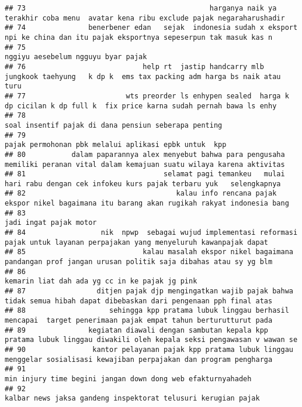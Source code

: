 \documentclass[
]{article}
\begin{document}
\begin{verbatim}
## 73                                            harganya naik ya terakhir coba menu  avatar kena ribu exclude pajak negaraharushadir  
## 74               benerbener edan   sejak  indonesia sudah x eksport npi ke china dan itu pajak eksportnya sepeserpun tak masuk kas n
## 75                                                                                                nggiyu aesebelum ngguyu byar pajak
## 76                            help rt  jastip handcarry mlb jungkook taehyung   k dp k  ems tax packing adm harga bs naik atau turu 
## 77                        wts preorder ls enhypen sealed  harga k dp cicilan k dp full k  fix price karna sudah pernah bawa ls enhy 
## 78                                                                            soal insentif pajak di dana pensiun seberapa penting  
## 79                                                                            pajak permohonan pbk melalui aplikasi epbk untuk  kpp 
## 80           dalam paparannya alex menyebut bahwa para pengusaha memiliki peranan vital dalam kemajuan suatu wilaya karena aktivitas
## 81                                 selamat pagi temankeu   mulai hari rabu dengan cek infokeu kurs pajak terbaru yuk   selengkapnya 
## 82                                    kalau info rencana pajak  ekspor nikel bagaimana itu barang akan rugikah rakyat indonesia bang
## 83                                                                                                           jadi ingat pajak motor 
## 84                  nik  npwp  sebagai wujud implementasi reformasi pajak untuk layanan perpajakan yang menyeluruh kawanpajak dapat 
## 85                            kalau masalah ekspor nikel bagaimana pandangan prof jangan urusan politik saja dibahas atau sy yg blm 
## 86                                                                                   kemarin liat dah ada yg cc in ke pajak jg pink 
## 87                 ditjen pajak djp mengingatkan wajib pajak bahwa tidak semua hibah dapat dibebaskan dari pengenaan pph final atas 
## 88                    sehingga kpp pratama lubuk linggau berhasil mencapai  target penerimaan pajak empat tahun berturutturut pada  
## 89               kegiatan diawali dengan sambutan kepala kpp pratama lubuk linggau diwakili oleh kepala seksi pengawasan v wawan se 
## 90                kantor pelayanan pajak kpp pratama lubuk linggau menggelar sosialisasi kewajiban perpajakan dan program pengharga 
## 91                                                                       min injury time begini jangan down dong web efakturnyahadeh
## 92                                                                   kalbar news jaksa gandeng inspektorat telusuri kerugian pajak  

\end{verbatim}
\end{document}
